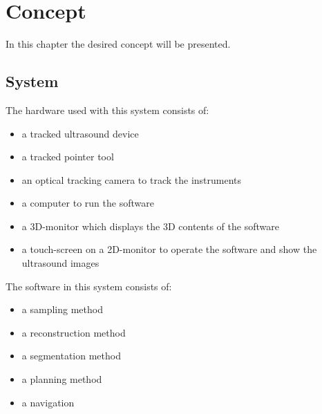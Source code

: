 \chapter{Concept}
In this chapter the desired concept will be presented. 
\section{System}
The hardware used with this system consists of:
\begin{itemize}
  \item a tracked ultrasound device
  \item a tracked pointer tool
  \item an optical tracking camera to track the instruments
  \item a computer to run the software
  \item a 3D-monitor which displays the 3D contents of the software 
  \item a touch-screen on a 2D-monitor to operate the software and show the
    ultrasound images
\end{itemize}
The software in this system consists of:
\begin{itemize}
  \item a sampling method 
  \item a reconstruction method 
  \item a segmentation method 
  \item a planning method 
  \item a navigation 
\end{itemize}

